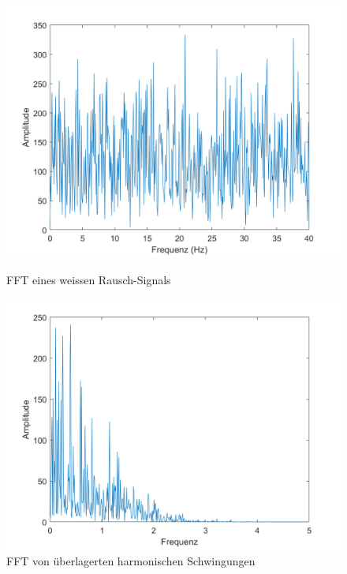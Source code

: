 \begin{figure}
	\begin{minipage}{0.45\textwidth}
		\centering
		\includegraphics[width=\linewidth]{papers/brown/images/FFTweissesRauschen.png}
		\caption{FFT eines weissen Rausch-Signals}
		\label{brown:FFTweissesRauschen}
	\end{minipage}
	\hspace{0.05\linewidth}
	\begin{minipage}{0.45\textwidth}
		\centering
		\includegraphics[width=\linewidth]{papers/brown/images/FFT-ueberlagerteSchwingungen.png}
		\caption{FFT von überlagerten harmonischen Schwingungen}
		\label{brown:FFTüberlagerteSchwingungen}
	\end{minipage}
\end{figure}


